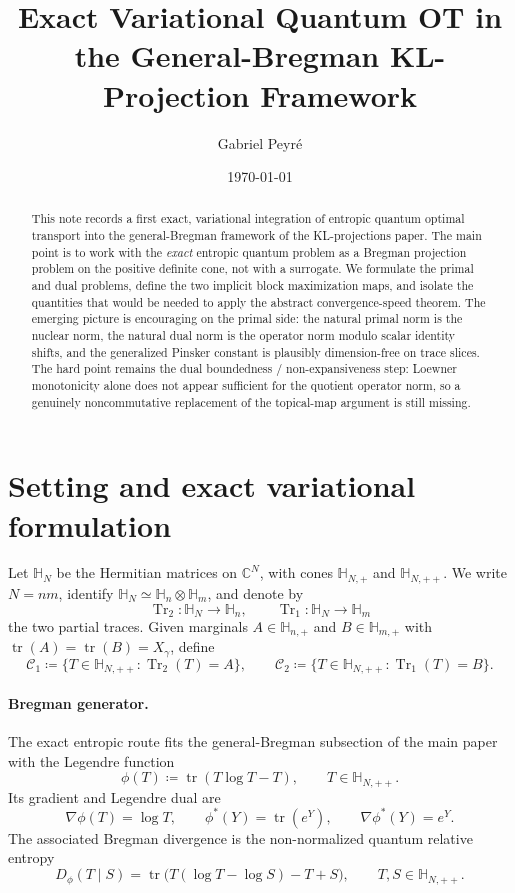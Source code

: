 \documentclass[11pt]{article}
\title{Exact Variational Quantum OT in the General-Bregman KL-Projection Framework}
\author{Gabriel Peyr\'e}
\date{\today}
\newcommand{\CC}{\mathbb{C}}
\newcommand{\tr}{\operatorname{tr}}
\newcommand{\Trone}{\operatorname{Tr}_{1}}
\newcommand{\Trtwo}{\operatorname{Tr}_{2}}
\newcommand{\eqdef}{\coloneqq}
\newcommand{\Hh}{\mathbb{H}}
\newcommand{\Cc}{\mathcal{C}}
\theoremstyle{plain}
\begin{document}
\maketitle

\begin{abstract}
This note records a first exact, variational integration of entropic quantum optimal transport into the general-Bregman framework of the KL-projections paper.
The main point is to work with the \emph{exact} entropic quantum problem as a Bregman projection problem on the positive definite cone, not with a surrogate.
We formulate the primal and dual problems, define the two implicit block maximization maps, and isolate the quantities that would be needed to apply the abstract convergence-speed theorem.
The emerging picture is encouraging on the primal side: the natural primal norm is the nuclear norm, the natural dual norm is the operator norm modulo scalar identity shifts, and the generalized Pinsker constant is plausibly dimension-free on trace slices.
The hard point remains the dual boundedness / non-expansiveness step: Loewner monotonicity alone does not appear sufficient for the quotient operator norm, so a genuinely noncommutative replacement of the topical-map argument is still missing.
\end{abstract}

\section{Setting and exact variational formulation}

Let $\Hh_N$ be the Hermitian matrices on $\CC^N$, with cones $\Hh_{N,+}$ and $\Hh_{N,++}$.
We write $N=nm$, identify $\Hh_N \simeq \Hh_n \otimes \Hh_m$, and denote by
\[
\Trtwo : \Hh_N \to \Hh_n,
\qquad
\Trone : \Hh_N \to \Hh_m
\]
the two partial traces.
Given marginals $A \in \Hh_{n,+}$ and $B \in \Hh_{m,+}$ with $\tr(A)=\tr(B)=X_\gamma$, define
\[
\Cc_1 \eqdef \{ T \in \Hh_{N,++} : \Trtwo(T)=A \},
\qquad
\Cc_2 \eqdef \{ T \in \Hh_{N,++} : \Trone(T)=B \}.
\]

\paragraph{Bregman generator.}
The exact entropic route fits the general-Bregman subsection of the main paper with the Legendre function
\[
\phi(T) \eqdef \tr(T \log T - T),
\qquad T \in \Hh_{N,++}.
\]
Its gradient and Legendre dual are
\[
\nabla \phi(T)=\log T,
\qquad
\phi^\ast(Y)=\tr(e^Y),
\qquad
\nabla \phi^\ast(Y)=e^Y.
\]
The associated Bregman divergence is the non-normalized quantum relative entropy
\begin{equation}
\label{eq:q-bregman}
D_\phi(T \mid S)
=
\tr\!\bigl(T(\log T-\log S)-T+S\bigr),
\qquad T,S \in \Hh_{N,++}.
\end{equation}
\end{document}
